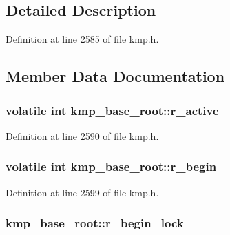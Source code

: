 \subsection{Detailed Description}


Definition at line 2585 of file kmp.\-h.



\subsection{Member Data Documentation}
\hypertarget{structkmp__base__root_a5e06d11eeaab64b07044ed113e702f88}{
\subsubsection[{r\-\_\-active}]{\setlength{\rightskip}{0pt plus 5cm}volatile {\bf int} kmp\-\_\-base\-\_\-root\-::r\-\_\-active}}\label{structkmp__base__root_a5e06d11eeaab64b07044ed113e702f88}


Definition at line 2590 of file kmp.\-h.

\hypertarget{structkmp__base__root_a5e3fa49193a2933672eb8cab130766ab}{
\subsubsection[{r\-\_\-begin}]{\setlength{\rightskip}{0pt plus 5cm}volatile {\bf int} kmp\-\_\-base\-\_\-root\-::r\-\_\-begin}}\label{structkmp__base__root_a5e3fa49193a2933672eb8cab130766ab}


Definition at line 2599 of file kmp.\-h.

\hypertarget{structkmp__base__root_ae225c346e2a58c1b7bdc13edc16885fc}{
\subsubsection[{r\-\_\-begin\-\_\-lock}]{ kmp\-\_\-base\-\_\-root\-::r\-\_\-begin\-\_\-lock}}\label{structkmp__base__root_ae225c346e2a58c1b7bdc13edc16885fc}


